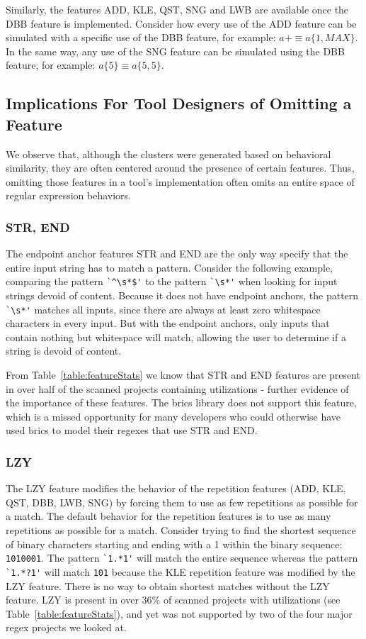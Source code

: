 Similarly, the features ADD, KLE, QST, SNG and LWB are available once the DBB feature is implemented.  Consider how every use of the ADD feature can be simulated with a specific use of the DBB feature, for example: $a+ \equiv a\{1, MAX\}$.  In the same way, any use of the SNG feature can be simulated using the DBB feature, for example:  $a\{5\} \equiv a\{5, 5\}$.

\subsection{Implications For Tool Designers of Omitting a Feature}

We observe that, although the clusters were generated based on behavioral similarity, they are often centered around the presence of certain features. Thus, omitting those features in a tool's implementation often omits an entire space of regular expression behaviors.

\subsubsection{STR, END}
The endpoint anchor features STR and END are the only way specify that the entire input string has to match a pattern.  Consider the following example, comparing the pattern \verb!`^\s*$'! to the pattern \verb!`\s*'! when looking for input strings devoid of content.  Because it does not have endpoint anchors, the pattern \verb!`\s*'! matches all inputs, since there are always at least zero whitespace characters in every input.  But with the endpoint anchors, only inputs that contain nothing but whitespace will match, allowing the user to determine if a string is devoid of content.

From Table~\ref{table:featureStats} we know that STR and END features are present in over half of the scanned projects containing utilizations - further evidence of the importance of these features.  The brics library does not support this feature, which is a missed opportunity for many developers who could otherwise have used brics to model their regexes that use STR and END.

\subsubsection{LZY}
The LZY feature modifies the behavior of the repetition features (ADD, KLE, QST, DBB, LWB, SNG) by forcing them to use as few repetitions as possible for a match.  The default behavior for the repetition features is to use as many repetitions as possible for a match.  Consider trying to find the shortest sequence of binary characters starting and ending with a 1 within the binary sequence: {\tt 1010001}. The pattern \verb!`1.*1'! will match the entire sequence whereas the pattern \verb!`1.*?1'! will match {\tt 101} because the KLE repetition feature was modified by the LZY feature.  There is no way to obtain shortest matches without the LZY feature.  LZY is present in over 36\% of scanned projects with utilizations (see Table~\ref{table:featureStats}), and yet was not supported by two of the four major regex projects we looked at.

